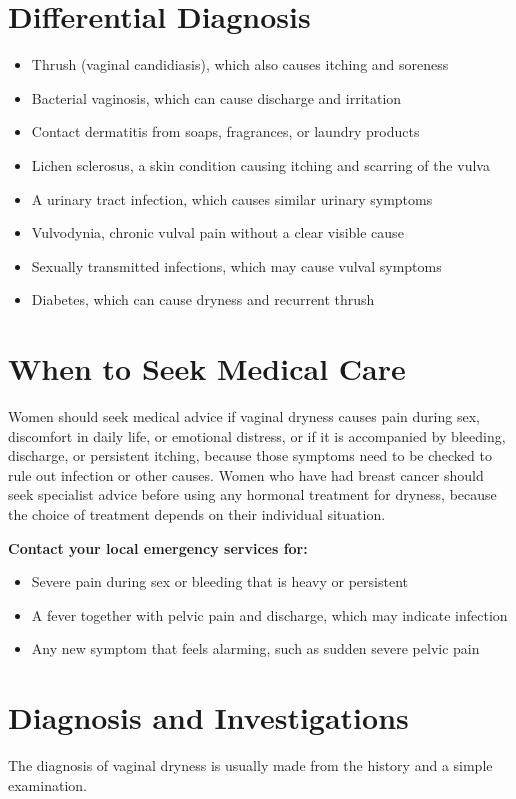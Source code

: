 \section*{Differential Diagnosis}
\begin{itemize}
    \item Thrush (vaginal candidiasis), which also causes itching and soreness
    \item Bacterial vaginosis, which can cause discharge and irritation
    \item Contact dermatitis from soaps, fragrances, or laundry products
    \item Lichen sclerosus, a skin condition causing itching and scarring of the vulva
    \item A urinary tract infection, which causes similar urinary symptoms
    \item Vulvodynia, chronic vulval pain without a clear visible cause
    \item Sexually transmitted infections, which may cause vulval symptoms
    \item Diabetes, which can cause dryness and recurrent thrush
\end{itemize}

\section*{When to Seek Medical Care}
Women should seek medical advice if vaginal dryness causes pain during sex, discomfort in daily life, or emotional distress, or if it is accompanied by bleeding, discharge, or persistent itching, because those symptoms need to be checked to rule out infection or other causes. Women who have had breast cancer should seek specialist advice before using any hormonal treatment for dryness, because the choice of treatment depends on their individual situation.

\textbf{Contact your local emergency services for:}
\begin{itemize}
    \item Severe pain during sex or bleeding that is heavy or persistent
    \item A fever together with pelvic pain and discharge, which may indicate infection
    \item Any new symptom that feels alarming, such as sudden severe pelvic pain
\end{itemize}

\section*{Diagnosis and Investigations}
The diagnosis of vaginal dryness is usually made from the history and a simple examination.


